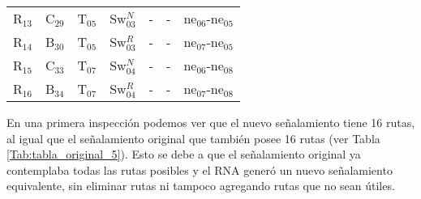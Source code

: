 \begin{table}[H]
{\begin{center}
{\begin{tabular}{ c c c c c c c }
                    R$_{13}$  & C$_{29}$ & T$_{05}$ & Sw$_{03}^{N}$ & - & - & ne$_{06}$-ne$_{05}$\\
                    R$_{14}$  & B$_{30}$ & T$_{05}$ & Sw$_{03}^{R}$ & - & - & ne$_{07}$-ne$_{05}$\\
                    R$_{15}$  & C$_{33}$ & T$_{07}$ & Sw$_{04}^{N}$ & - & - & ne$_{06}$-ne$_{08}$\\
                    R$_{16}$  & B$_{34}$ & T$_{07}$ & Sw$_{04}^{R}$ & - & - & ne$_{07}$-ne$_{08}$\\
                \hline
            \end{tabular}
        }
    	\end{center}
     }
    \end{table}
    
    En una primera inspección podemos ver que el nuevo señalamiento tiene 16 rutas, al igual que el señalamiento original que también posee 16 rutas (ver Tabla \ref{Tab:tabla_original_5}). Esto se debe a que el señalamiento original ya contemplaba todas las rutas posibles y el RNA generó un nuevo señalamiento equivalente, sin eliminar rutas ni tampoco agregando rutas que no sean útiles.